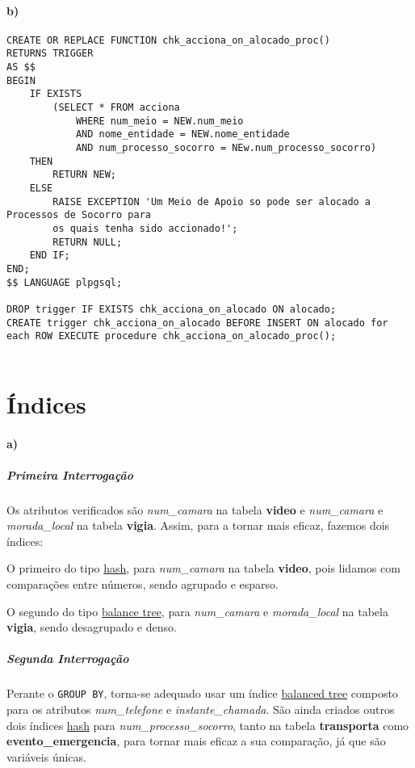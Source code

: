 \documentclass[10pt,a4paper]{article}
\begin{document}
\paragraph{b)}
\begin{verbatim}
CREATE OR REPLACE FUNCTION chk_acciona_on_alocado_proc()
RETURNS TRIGGER
AS $$
BEGIN
    IF EXISTS
        (SELECT * FROM acciona
            WHERE num_meio = NEW.num_meio
            AND nome_entidade = NEW.nome_entidade
            AND num_processo_socorro = NEw.num_processo_socorro)
    THEN
        RETURN NEW;
    ELSE
        RAISE EXCEPTION 'Um Meio de Apoio so pode ser alocado a Processos de Socorro para
        os quais tenha sido accionado!';
        RETURN NULL;
    END IF;
END;
$$ LANGUAGE plpgsql;

DROP trigger IF EXISTS chk_acciona_on_alocado ON alocado;
CREATE trigger chk_acciona_on_alocado BEFORE INSERT ON alocado for each ROW EXECUTE procedure chk_acciona_on_alocado_proc();
    
\end{verbatim}
\section{Índices}

\paragraph{a)}
\subparagraph{Primeira Interrogação}
Os atributos verificados são \textit{num\_camara} na tabela \textbf{video} e \textit{num\_camara} e \textit{morada\_local} na tabela \textbf{vigia}.
Assim, para a tornar mais eficaz, fazemos dois índices:

O primeiro do tipo \underline{hash}, para \textit{num\_camara} na tabela \textbf{video}, pois lidamos com comparações entre números,
sendo agrupado e esparso.

O segundo do tipo \underline{balance tree}, para \textit{num\_camara} e \textit{morada\_local} na tabela \textbf{vigia}, sendo desagrupado e denso.

\subparagraph{Segunda Interrogação}
Perante o \texttt{GROUP BY}, torna-se adequado usar um índice \underline{balanced tree} composto para os atributos
\textit{num\_telefone} e \textit{instante\_chamada}.
São ainda criados outros dois índices \underline{hash} para \textit{num\_processo\_socorro}, tanto na tabela \textbf{transporta} como \textbf{evento\_emergencia},
para tornar mais eficaz a sua comparação, já que são variáveis únicas.
\end{document}
